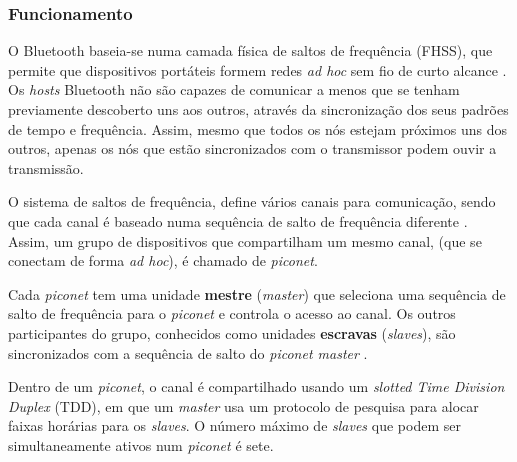 \documentclass[conference]{IEEEtran}
\begin{document}
\subsubsection{Funcionamento}



O Bluetooth baseia-se numa camada física de saltos de frequência (FHSS), que permite que dispositivos portáteis formem redes \textit{ad hoc} sem fio de curto alcance \cite{salonidis2005distributed}. 
Os \textit{hosts} Bluetooth não são capazes de comunicar a menos que se tenham previamente descoberto uns aos outros, através da sincronização dos seus padrões de tempo e frequência. 
Assim, mesmo que todos os nós estejam próximos uns dos outros, apenas os nós que estão sincronizados com o transmissor podem ouvir a transmissão.

O sistema de saltos de frequência, define vários canais para comunicação, sendo que cada canal é baseado numa sequência de salto de frequência diferente \cite{salonidis2005distributed}. 
Assim, um grupo de dispositivos que compartilham um mesmo canal, (que se conectam de forma \textit{ad hoc}), é chamado de \textit{piconet}. 

Cada \textit{piconet} tem uma unidade \textbf{mestre} (\textit{master}) que seleciona uma sequência de salto de frequência para o \textit{piconet} e controla o acesso ao canal. 
Os outros participantes do grupo, conhecidos como unidades \textbf{escravas} (\textit{slaves}), são sincronizados com a sequência de salto do \textit{piconet master} \cite{salonidis2005distributed}. 

Dentro de um \textit{piconet}, o canal é compartilhado usando um \textit{slotted Time Division Duplex} (TDD), em que um \textit{master} usa um protocolo de pesquisa para alocar faixas horárias para os \textit{slaves}. O número máximo de \textit{slaves} que podem ser simultaneamente ativos num \textit{piconet} é sete.
\end{document}
